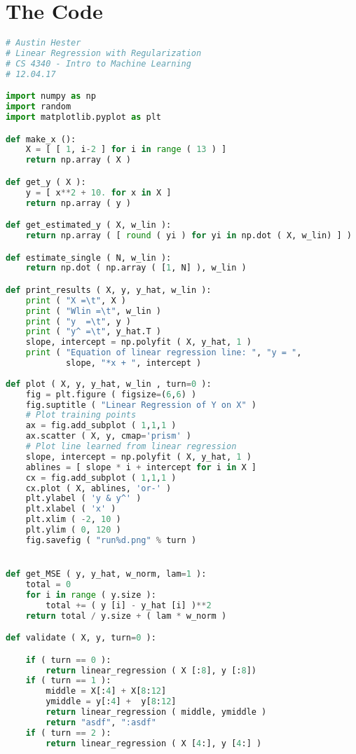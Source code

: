 \documentclass{article}
\begin{document}
\newpage
\section*{The Code}
\lstset{
	frame=tb,
	tabsize=4,
	showstringspaces=false
}
\begin{lstlisting}[language=Python,breaklines=true]
# Austin Hester
# Linear Regression with Regularization
# CS 4340 - Intro to Machine Learning
# 12.04.17

import numpy as np
import random
import matplotlib.pyplot as plt

def make_x ():
    X = [ [ 1, i-2 ] for i in range ( 13 ) ]
    return np.array ( X )

def get_y ( X ):
    y = [ x**2 + 10. for x in X ]
    return np.array ( y )

def get_estimated_y ( X, w_lin ):
    return np.array ( [ round ( yi ) for yi in np.dot ( X, w_lin) ] )

def estimate_single ( N, w_lin ):
    return np.dot ( np.array ( [1, N] ), w_lin )

def print_results ( X, y, y_hat, w_lin ):
    print ( "X =\t", X )
    print ( "Wlin =\t", w_lin )
    print ( "y  =\t", y )
    print ( "y^ =\t", y_hat.T )
    slope, intercept = np.polyfit ( X, y_hat, 1 )
    print ( "Equation of linear regression line: ", "y = ",
            slope, "*x + ", intercept )
    
def plot ( X, y, y_hat, w_lin , turn=0 ):
    fig = plt.figure ( figsize=(6,6) )
    fig.suptitle ( "Linear Regression of Y on X" )
    # Plot training points
    ax = fig.add_subplot ( 1,1,1 )
    ax.scatter ( X, y, cmap='prism' )
    # Plot line learned from linear regression
    slope, intercept = np.polyfit ( X, y_hat, 1 )
    ablines = [ slope * i + intercept for i in X ]
    cx = fig.add_subplot ( 1,1,1 )
    cx.plot ( X, ablines, 'or-' )
    plt.ylabel ( 'y & y^' )
    plt.xlabel ( 'x' )
    plt.xlim ( -2, 10 )
    plt.ylim ( 0, 120 )
    fig.savefig ( "run%d.png" % turn )


def get_MSE ( y, y_hat, w_norm, lam=1 ):
    total = 0
    for i in range ( y.size ):
        total += ( y [i] - y_hat [i] )**2
    return total / y.size + ( lam * w_norm )

def validate ( X, y, turn=0 ):

    if ( turn == 0 ):
        return linear_regression ( X [:8], y [:8])
    if ( turn == 1 ):
        middle = X[:4] + X[8:12]
        ymiddle = y[:4] +  y[8:12]
        return linear_regression ( middle, ymiddle )
        return "asdf", ":asdf"
    if ( turn == 2 ):
        return linear_regression ( X [4:], y [4:] )
    

\end{lstlisting}
\end{document}
